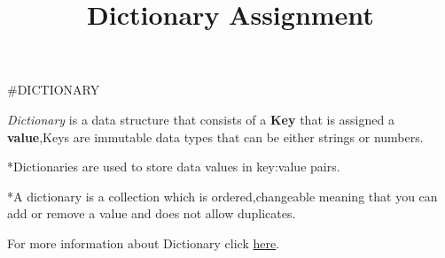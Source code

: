 \documentclass[
]{article}
\title{Dictionary Assignment}
\author{}
\date{\vspace{-2.5em}}
\begin{document}
\maketitle

\#DICTIONARY

\emph{Dictionary} is a data structure that consists of a \textbf{Key}
that is assigned a \textbf{value},Keys are immutable data types that can
be either strings or numbers.

*Dictionaries are used to store data values in key:value pairs.

*A dictionary is a collection which is ordered,changeable meaning that
you can add or remove a value and does not allow duplicates.

For more information about Dictionary click
\href{https://www.datacamp.com/community/tutorials/dictionary-python?utm_source=adwords_ppc\&utm_campaignid=1455363063\&utm_adgroupid=65083631748\&utm_device=c\&utm_keyword=\&utm_matchtype=b\&utm_network=g\&utm_adpostion=\&utm_creative=278443377095\&utm_targetid=aud-299261629614:dsa-429603003980\&utm_loc_interest_ms=\&utm_loc_physical_ms=1012087\&gclid=Cj0KCQjw1a6EBhC0ARIsAOiTkrFFLqmK0CDX9FMpBxcQq0VJLA29F9WqRmqogYmHWS2EStZnnGB9_GYaAsG9EALw_wcB}{here}.
\end{document}
